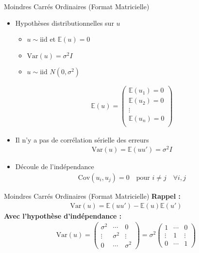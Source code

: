 \documentclass{beamer}
\begin{document}
\begin{frame}{Moindres Carrés Ordinaires (Format Matricielle)}
\begin{itemize}
  \item Hypothèses distributionnelles sur \( u \)
  \begin{itemize}
    \item \( u \sim \text{iid} \) et \( \mathbb{E}(u) = 0 \)
    \item \( \text{Var}(u) = \sigma^2 I \)
    \item \( u \sim \text{iid } N(0, \sigma^2) \)
  \end{itemize}
  \begin{align*}
    \mathbb{E}(u) = \begin{pmatrix}
      \mathbb{E}(u_1) = 0 \\ 
      \mathbb{E}(u_2) = 0 \\ 
      \vdots \\
      \mathbb{E}(u_n) = 0 \\
    \end{pmatrix}
  \end{align*}
  \item Il n'y a pas de corrélation sérielle des erreurs 
  \begin{align*}
    \text{Var}(u) = \mathbb{E}(uu') = \sigma^2 I 
  \end{align*}
  \item Découle de l'indépendance
  \begin{align*}
    \text{Cov}(u_i, u_j) = 0 \quad \text{pour } i \neq j \quad \forall i, j
  \end{align*}
\end{itemize}

\end{frame}

\begin{frame}{Moindres Carrés Ordinaires (Format Matricielle)}
\textbf{Rappel :}
\begin{align*}
  \text{Var}(u) = \mathbb{E}(uu') - \mathbb{E}(u)\mathbb{E}(u') 
\end{align*}
\textbf{Avec l'hypothèse d'indépendance :}
\begin{align*}
  \text{Var}(u) = \begin{pmatrix}
    \sigma^2 & \cdots & 0 \\ 
    \vdots & \sigma^2 & \vdots \\ 
    0 & \cdots & \sigma^2
  \end{pmatrix} = \sigma^2 \begin{pmatrix}
    1 & \cdots & 0 \\ 
    \vdots & 1 & \vdots \\ 
    0 & \cdots & 1
  \end{pmatrix} 
\end{align*}
\end{frame}
\end{document}
